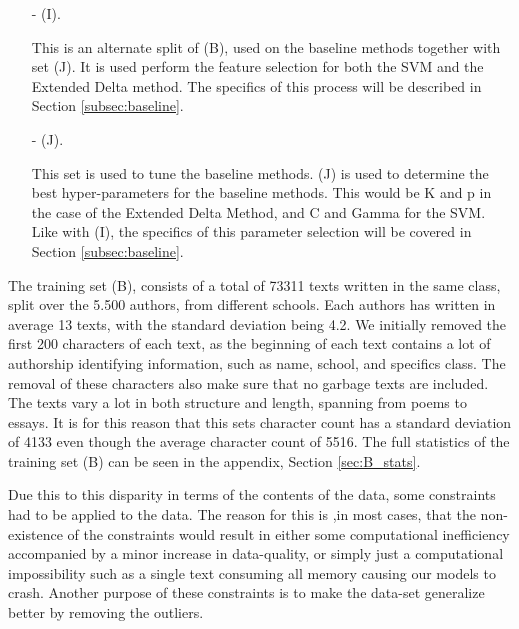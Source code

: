 \begin{itemize}
    \item[- (I).]

        This is an alternate split of (B), used on the baseline methods together
        with set (J). It is used perform the feature selection for both the SVM
        and the Extended Delta method. The specifics of this process will be
        described in Section \ref{subsec:baseline}.

    \item[- (J).]

        This set is used to tune the baseline methods. (J) is used to determine
        the best hyper-parameters for the baseline methods. This would be K and
        p in the case of the Extended Delta Method, and C and Gamma for the SVM.
        Like with (I), the specifics of this parameter selection will be covered
        in Section \ref{subsec:baseline}.

\end{itemize}

The training set (B), consists of a total of 73311 texts written in the same
class, split over the 5.500 authors, from different schools. Each authors has
written in average 13 texts, with the standard deviation being 4.2. We initially
removed the first 200 characters of each text, as the beginning of each text
contains a lot of authorship identifying information, such as name, school, and
specifics class. The removal of these characters also make sure that no garbage
texts are included. The texts vary a lot in both structure and length, spanning
from poems to essays. It is for this reason that this sets character count has
a standard deviation of 4133 even though the average character count of 5516.
The full statistics of the training set (B) can be seen in the appendix, Section
\ref{sec:B_stats}.

Due this to this disparity in terms of the contents of the data, some
constraints had to be applied to the data. The reason for this is ,in most
cases, that the non-existence of the constraints would result in either some
computational inefficiency accompanied by a minor increase in data-quality, or
simply just a computational impossibility such as a single text consuming all
memory causing our models to crash. Another purpose of these constraints is to
make the data-set generalize better by removing the outliers.


